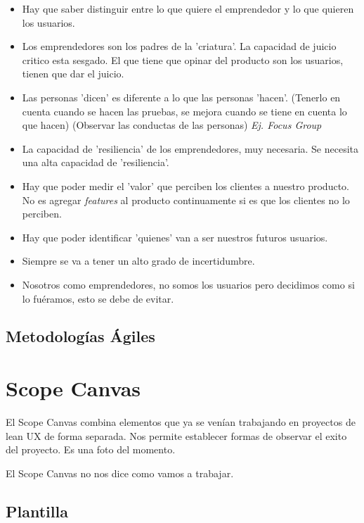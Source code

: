 \documentclass[titlepage,a4paper]{article}
\begin{document}
\begin{itemize}
    \item Hay que saber distinguir entre lo que quiere el emprendedor y lo que quieren los usuarios.
    \item Los emprendedores son los padres de la 'criatura'. La capacidad de juicio critico esta sesgado. El que tiene que opinar del producto son los usuarios, tienen que dar el juicio.
    \item Las personas 'dicen' es diferente a lo que las personas 'hacen'. (Tenerlo en cuenta cuando se hacen las pruebas, se mejora cuando se tiene en cuenta lo que hacen) (Observar las conductas de las personas) \textit{Ej. Focus Group}
    \item La capacidad de 'resiliencia' de los emprendedores, muy necesaria. Se necesita una alta capacidad de 'resiliencia'.
    \item Hay que poder medir el 'valor' que perciben los clientes a nuestro producto. No es agregar \emph{features} al producto continuamente si es que los clientes no lo perciben.
    \item Hay que poder identificar 'quienes' van a ser nuestros futuros usuarios.
    \item Siempre se va a tener un alto grado de incertidumbre.
    \item Nosotros como emprendedores, no somos los usuarios pero decidimos como si lo fuéramos, esto se debe de evitar. 
\end{itemize}

\subsection{Metodologías Ágiles}

\section{Scope Canvas}

El Scope Canvas combina elementos que ya se venían trabajando en proyectos de lean UX de forma separada. Nos permite establecer formas de observar el exito del proyecto. Es una foto del momento.


El Scope Canvas no nos dice como vamos a trabajar.

\subsection{Plantilla}
\end{document}
